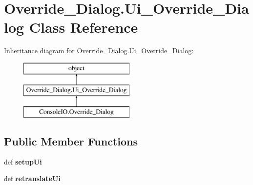 \hypertarget{classOverride__Dialog_1_1Ui__Override__Dialog}{\section{Override\-\_\-\-Dialog.\-Ui\-\_\-\-Override\-\_\-\-Dialog Class Reference}
\label{classOverride__Dialog_1_1Ui__Override__Dialog}
}
Inheritance diagram for Override\-\_\-\-Dialog.\-Ui\-\_\-\-Override\-\_\-\-Dialog\-:\begin{figure}[H]
\begin{center}
\leavevmode
\includegraphics[height=3.000000cm]{classOverride__Dialog_1_1Ui__Override__Dialog}
\end{center}
\end{figure}
\subsection*{Public Member Functions}
\begin{DoxyCompactItemize}
\item 
\hypertarget{classOverride__Dialog_1_1Ui__Override__Dialog_a3bbcb40810b6afaf62c8c5df2d567268}{def {\bfseries setup\-Ui}}\label{classOverride__Dialog_1_1Ui__Override__Dialog_a3bbcb40810b6afaf62c8c5df2d567268}

\item 
\hypertarget{classOverride__Dialog_1_1Ui__Override__Dialog_a9d3be752381f7d1c2015b3a32f9e6a59}{def {\bfseries retranslate\-Ui}}\label{classOverride__Dialog_1_1Ui__Override__Dialog_a9d3be752381f7d1c2015b3a32f9e6a59}

\end{DoxyCompactItemize}
